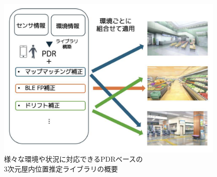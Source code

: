 \begin{figure}[h]
	\centering
	\includegraphics[width=\linewidth]{../image/first.pdf}
	\caption{様々な環境や状況に対応できるPDRベースの\\3次元屋内位置推定ライブラリの概要}    \label{fig:overview}
\end{figure}
